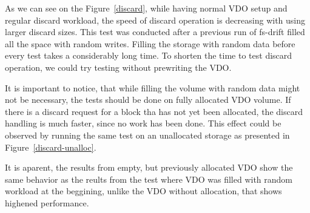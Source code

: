 \documentclass[
  color, %
  table, %
  lof,   %
  lot,   %
]{fithesis3}
\begin{document}
As we can see on the Figure~\ref{discard}, while having normal VDO setup and regular discard workload, the speed of discard operation is decreasing with using larger discard sizes. This test was conducted after a previous run of fs-drift filled all the space with random writes. Filling the storage with random data before every test takes a considerably long time. To shorten the time to test discard operation, we could try testing without prewriting the VDO.

It is important to notice, that while filling the volume with random data might not be necessary, the tests should be done on fully allocated VDO volume. If there is a discard request for a block tha has not yet been allocated, the discard handling is much faster, since no work has been done. This effect could be observed by running the same test on an unallocated storage as presented in Figure~\ref{discard-unalloc}.

It is aparent, the results from empty, but previously allocated VDO show the same behavior as the reults from the test where VDO was filled with random workload at the beggining, unlike the VDO without allocation, that shows highened performance.
\end{document}
